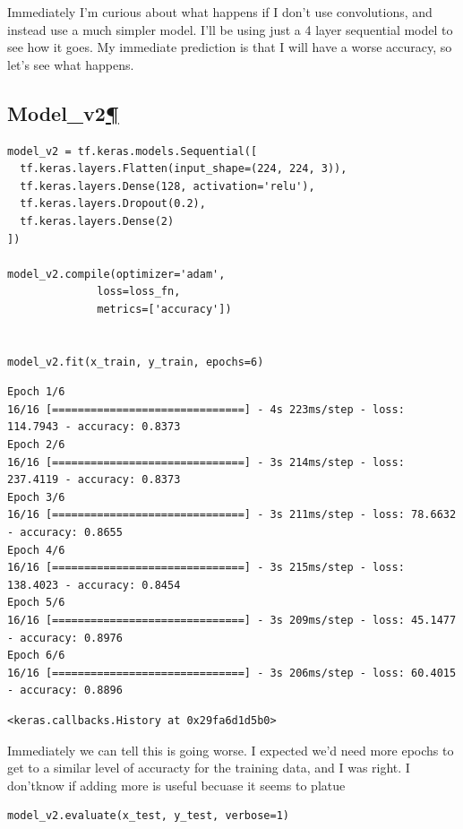 \documentclass[
]{article}
\begin{document}
Immediately I'm curious about what happens if I don't use convolutions,
and instead use a much simpler model. I'll be using just a 4 layer
sequential model to see how it goes. My immediate prediction is that I
will have a worse accuracy, so let's see what happens.

\hypertarget{Model_v2}{%
\subsection{\texorpdfstring{Model\_v2\protect\hyperlink{Model_v2}{¶}}{Model\_v2¶}}\label{Model_v2}}

\begin{Verbatim}[frame=single]
model_v2 = tf.keras.models.Sequential([
  tf.keras.layers.Flatten(input_shape=(224, 224, 3)),
  tf.keras.layers.Dense(128, activation='relu'),
  tf.keras.layers.Dropout(0.2),
  tf.keras.layers.Dense(2)
])

model_v2.compile(optimizer='adam',
              loss=loss_fn,
              metrics=['accuracy'])


model_v2.fit(x_train, y_train, epochs=6)
\end{Verbatim}

\begin{verbatim}
Epoch 1/6
16/16 [==============================] - 4s 223ms/step - loss: 114.7943 - accuracy: 0.8373
Epoch 2/6
16/16 [==============================] - 3s 214ms/step - loss: 237.4119 - accuracy: 0.8373
Epoch 3/6
16/16 [==============================] - 3s 211ms/step - loss: 78.6632 - accuracy: 0.8655
Epoch 4/6
16/16 [==============================] - 3s 215ms/step - loss: 138.4023 - accuracy: 0.8454
Epoch 5/6
16/16 [==============================] - 3s 209ms/step - loss: 45.1477 - accuracy: 0.8976
Epoch 6/6
16/16 [==============================] - 3s 206ms/step - loss: 60.4015 - accuracy: 0.8896
\end{verbatim}

\begin{verbatim}
<keras.callbacks.History at 0x29fa6d1d5b0>
\end{verbatim}

Immediately we can tell this is going worse. I expected we'd need more
epochs to get to a similar level of accuracty for the training data, and
I was right. I don'tknow if adding more is useful becuase it seems to
platue

\begin{Verbatim}[frame=single]
model_v2.evaluate(x_test, y_test, verbose=1)
\end{Verbatim}
\end{document}
